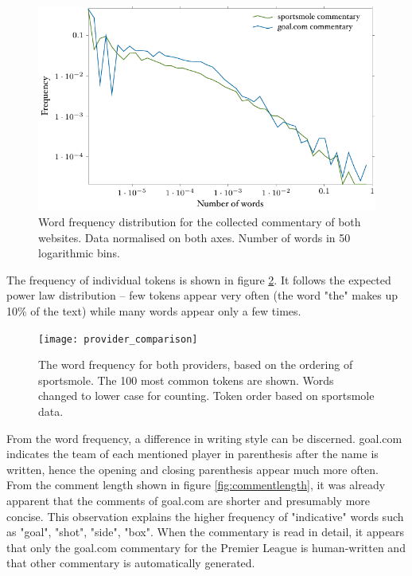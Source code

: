 \documentclass[10pt, a4paper]{UUThesisTemplate}
\begin{document}
\begin{figure}[h!]\centering
\includegraphics{figures/fig_word_frequency.pdf}
\caption{Word frequency distribution for the collected commentary of both websites. Data normalised on both axes. Number of words in 50 logarithmic bins.}\label{fig:wordfrequency}
\end{figure}

The frequency of individual tokens is shown in figure \ref{fig:frequencycomparison}. It follows the expected power law distribution – few tokens appear very often (the word "the" makes up 10\% of the text) while many words appear only a few times.

\begin{figure}\centering
\texttt{[image: provider\_comparison]}
\caption{The word frequency for both providers, based on the ordering of sportsmole. The 100 most common tokens are shown. Words changed to lower case for counting. Token order based on sportsmole data.}
\label{fig:frequencycomparison}
\end{figure}

From the word frequency, a difference in writing style can be discerned. goal.com indicates the team of each mentioned player in parenthesis after the name is written, hence the opening and closing parenthesis appear much more often. From the comment length shown in figure \ref{fig:commentlength}, it was already apparent that the comments of goal.com are shorter and presumably more concise. This observation explains the higher frequency of "indicative" words such as "goal", "shot", "side", "box". When the commentary is read in detail, it appears that only the goal.com commentary for the Premier League is human-written and that other commentary is automatically generated.
\end{document}
